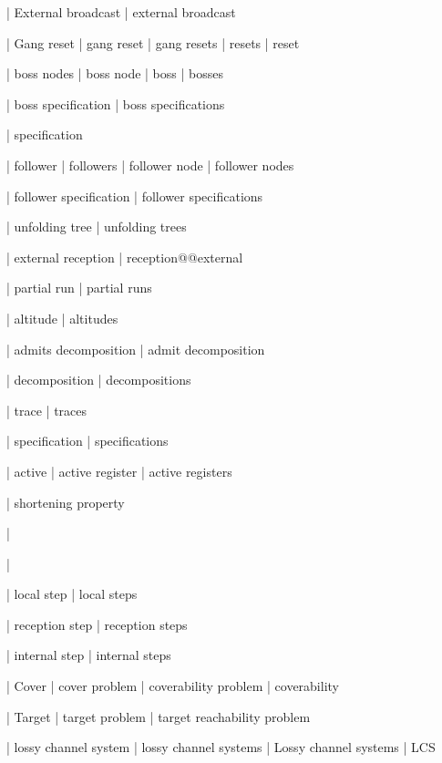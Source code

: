 | External broadcast
| external broadcast

| Gang reset
| gang reset
| gang resets
| resets
| reset


| boss nodes
| boss node
| boss
| bosses

| boss specification
| boss specifications

| specification

| follower
| followers
| follower node
| follower nodes

| follower specification
| follower specifications

| unfolding tree
| unfolding trees

| external reception
| reception@@external

| partial run
| partial runs

| altitude
| altitudes

| admits decomposition
| admit decomposition

| decomposition
| decompositions

| trace
| traces

| specification
| specifications


| active
| active register
| active registers

| shortening property

| \memoryproj

| \memoryproj

| local step
| local steps

| reception step
| reception steps

| internal step
| internal steps


| Cover
| cover problem
| coverability problem
| coverability

| Target
| target problem
| target reachability problem


| lossy channel system
| lossy channel systems
| Lossy channel systems
| LCS

